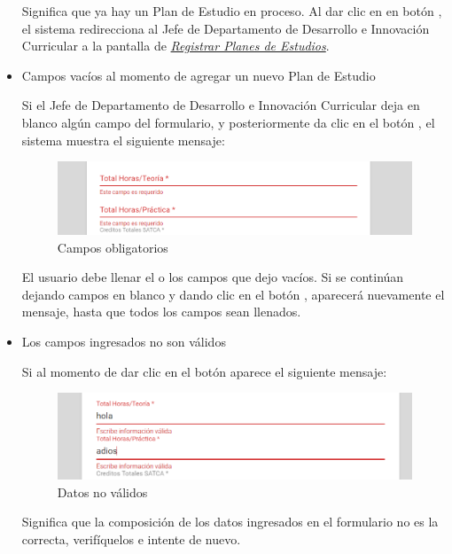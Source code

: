 \begin{itemize}
	Significa que ya hay un Plan de Estudio en proceso. Al dar clic en en botón , el sistema redirecciona al Jefe de Departamento de Desarrollo e Innovación Curricular a la pantalla de \hyperlink{registrarPE}{\textit{Registrar Planes de Estudios}}.

	\item Campos vacíos al momento de agregar un nuevo Plan de Estudio

	Si el Jefe de Departamento de Desarrollo e Innovación Curricular deja en blanco algún campo del formulario, y posteriormente da clic en el botón , el sistema muestra el siguiente mensaje:
		\begin{figure}[H]
		\centering
		\hypertarget{ms4}{\includegraphics[width=0.7\linewidth]{images/SP4-GPE/m4}}
		\caption{Campos obligatorios}
		\label{ms4}
	    \end{figure}

	El usuario debe llenar el o los campos que dejo vacíos. Si se continúan dejando campos en blanco y dando clic en el botón , aparecerá nuevamente el mensaje, hasta que todos los campos sean llenados.\\

	\newpage

	\item Los campos ingresados no son válidos

	Si al momento de dar clic en el botón  aparece el siguiente mensaje:
	\begin{figure}[H]
		\centering
		\hypertarget{ms5}{\includegraphics[width=0.7\linewidth]{images/SP4-GPE/m5}}
		\caption{Datos no válidos}
		\label{ms5}
	\end{figure}

	Significa que la composición de los datos ingresados en el formulario no es la correcta, verifíquelos e intente de nuevo.

\end{itemize}
